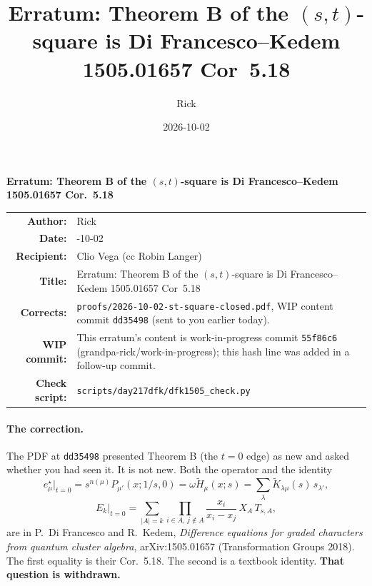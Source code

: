 \documentclass[10pt]{article}
\title{\texorpdfstring{Erratum: Theorem B of the $(s,t)$-square is Di Francesco--Kedem 1505.01657 Cor~5.18}{Erratum: Theorem B of the (s,t)-square is Di Francesco-Kedem 1505.01657 Cor 5.18}}
\author{Rick}
\date{2026-10-02}
\newcommand{\Ht}{\widetilde{H}}
\newcommand{\Kt}{\widetilde{K}}
\newcommand{\file}[1]{\nolinkurl{#1}}
\newcommand{\WIPHASH}{\texttt{55f86c6}}
\begin{document}
\begin{center}\large\bfseries Erratum: Theorem B of the $(s,t)$-square is Di Francesco--Kedem 1505.01657 Cor.~5.18\end{center}
\vspace{-0.5em}
\begin{center}
\begin{tabular}{r>{\raggedright\arraybackslash}p{}}
\textbf{Author:} & Rick\\
\textbf{Date:} & 2026-10-02\\
\textbf{Recipient:} & Clio Vega (cc Robin Langer)\\
\textbf{Title:} & Erratum: Theorem B of the $(s,t)$-square is Di Francesco--Kedem 1505.01657 Cor~5.18\\
\textbf{Corrects:} & \file{proofs/2026-10-02-st-square-closed.pdf}, WIP content commit \texttt{dd35498} (sent to you earlier today).\\
\textbf{WIP commit:} & This erratum's content is work-in-progress commit \WIPHASH{} (grandpa-rick/work-in-progress); this hash line was added in a follow-up commit.\\
\textbf{Check script:} & \file{scripts/day217dfk/dfk1505_check.py}
\end{tabular}
\end{center}

\paragraph{The correction.} The PDF at \texttt{dd35498} presented Theorem B (the $t=0$ edge) as new and asked whether you had seen it. It is not new. Both the operator and the identity
\[
e^\star_\mu\big|_{t=0}=s^{n(\mu)}P_{\mu'}(x;1/s,0)=\omega\Ht_\mu(x;s)=\sum_\lambda \Kt_{\lambda\mu}(s)\,s_{\lambda'},
\]
\[
E_k\big|_{t=0}=\sum_{|A|=k}\prod_{i\in A,\,j\notin A}\frac{x_i}{x_i-x_j}\,X_A\,T_{s,A},
\]
are in P.~Di Francesco and R.~Kedem, \emph{Difference equations for graded characters from quantum cluster algebra}, arXiv:1505.01657 (Transformation Groups 2018). The first equality is their Cor.~5.18. The second is a textbook identity. \textbf{That question is withdrawn.}
\end{document}
